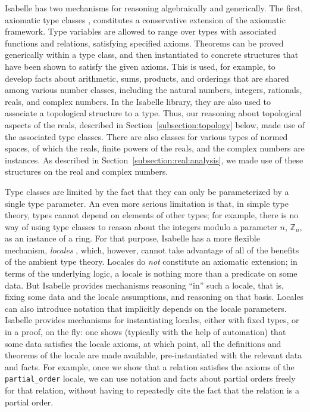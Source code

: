 \documentclass{svjour3}
\newcommand{\ZZ}{\mathbb{Z}}
\begin{document}
Isabelle has two mechanisms for reasoning algebraically and generically. The first, axiomatic type classes \cite{wenzel:97}, constitutes a conservative extension of the axiomatic framework. Type variables are allowed to range over types with associated functions and relations, satisfying specified axioms. Theorems can be proved generically within a type class, and then instantiated to concrete structures that have been shown to satisfy the given axioms. This is used, for example, to develop facts about arithmetic, sums, products, and orderings that are shared among various number classes, including the natural numbers, integers, rationals, reals, and complex numbers. In the Isabelle library, they are also used to associate a topological structure to a type. Thus, our reasoning about topological aspects of the reals, described in Section~\ref{subsection:topology} below, made use of the associated type classes. There are also classes for various types of normed spaces, of which the reals, finite powers of the reals, and the complex numbers are instances. As described in Section~\ref{subsection:real:analysis}, we made use of these structures on the real and complex numbers.

Type classes are limited by the fact that they can only be parameterized by a single type parameter. An even more serious limitation is that, in simple type theory, types cannot depend on elements of other types; for example, there is no way of using type classes to reason about the integers modulo a parameter $n$, $\ZZ_n$, as an instance of a ring. For that purpose, Isabelle has a more flexible mechanism, \emph{locales} \cite{ballarin:06}, which, however, cannot take advantage of all of the benefits of the ambient type theory. Locales do \emph{not} constitute an axiomatic extension; in terms of the underlying logic, a locale is nothing more than a predicate on some data. But Isabelle provides mechanisms reasoning ``in'' such a locale, that is, fixing some data and the locale assumptions, and reasoning on that basis. Locales can also introduce notation that implicitly depends on the locale parameters. Isabelle provides mechanisms for instantiating locales, either with fixed types, or in a proof, on the fly: one shows (typically with the help of automation) that some data satisfies the locale axioms, at which point, all the definitions and theorems of the locale are made available, pre-instantiated with the relevant data and facts. For example, once we show that a relation satisfies the axioms of the \verb=partial_order= locale, we can use notation and facts about partial orders freely for that relation, without having to repeatedly cite the fact that the relation is a partial order.
\end{document}
